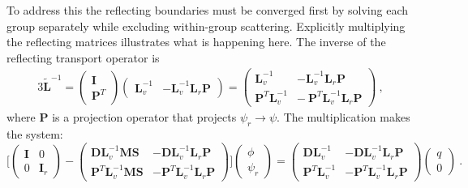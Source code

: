\documentclass[12pt, letterpaper]{article}
\newcommand{\ve}[1]{\ensuremath{\mathbf{#1}}}
\begin{document}
To address this the reflecting boundaries must be converged first by solving each group separately while excluding within-group scattering. Explicitly multiplying the reflecting matrices illustrates what is happening here. The inverse of the reflecting transport operator is
%
\begin{alignat}{3}
 \ve{\tilde{L}}^{-1} = \begin{pmatrix} \ve{I} \\ \ve{P}^{T} \end{pmatrix}
 \begin{pmatrix} \ve{L}_{v}^{-1} & -\ve{L}_{v}^{-1} \ve{L}_{r} \ve{P} \end{pmatrix}
 =
 \begin{pmatrix} \ve{L}_{v}^{-1} & -\ve{L}_{v}^{-1} \ve{L}_{r} \ve{P} \\
                   \ve{P}^{T}\ve{L}_{v}^{-1} & -\ \ve{P}^{T}\ve{L}_{v}^{-1} \ve{L}_{r} \ve{P} \end{pmatrix}  \:,
\label{eq:reflInverse}
\end{alignat} 
%
where $\ve{P}$ is a projection operator that projects $\psi_{r} \to \psi$. The multiplication makes the system:
%
\begin{equation}
  \Bigg[ \begin{pmatrix} \ve{I} & 0 \\ 0 & \ve{I}_{r} \end{pmatrix} - 
  \begin{pmatrix} \ve{DL}_{v}^{-1}\ve{MS} & -\ve{DL}_{v}^{-1}\ve{L}_{r}\ve{P} \\
                      \ve{P}^{T}\ve{L}_{v}^{-1}\ve{MS} & - \ve{P}^{T}\ve{L}_{v}^{-1} \ve{L}_{r} \ve{P} \end{pmatrix} \Bigg]
  \begin{pmatrix} \phi \\ \psi_{r} \end{pmatrix}
  =
  \begin{pmatrix} \ve{DL}_{v}^{-1} & -\ve{DL}_{v}^{-1}\ve{L}_{r}\ve{P} \\
                     \ve{P}^{T}\ve{L}_{v}^{-1} & - \ve{P}^{T}\ve{L}_{v}^{-1} \ve{L}_{r} \ve{P} \end{pmatrix}
  \begin{pmatrix} q \\ 0 \end{pmatrix} \:.
\label{eq:explicitBlocks}
\end{equation}
% 
\end{document}
